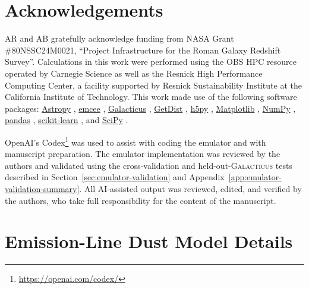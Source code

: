 \documentclass[twocolumn, apj, numberedappendix, iop]{openjournal}
\newcommand{\galacticus}{\textsc{Galacticus}\xspace}
\begin{document}
\section*{Acknowledgements}

AR and AB gratefully acknowledge funding from NASA Grant  \#80NSSC24M0021, ``Project Infrastructure for the Roman Galaxy Redshift Survey''. Calculations in this work were performed using the OBS HPC resource operated by Carnegie Science as well as the Resnick High Performance Computing Center, a facility supported by Resnick Sustainability Institute at the California Institute of Technology. This work made use of the following software packages: \href{https://www.astropy.org/}{{Astropy}}
\citep{astropy1, astropy2},
\href{https://emcee.readthedocs.io/en/stable/}{{emcee}}
\citep{ForemanMackey:2013io},
\href{https://github.com/galacticusorg/galacticus}{{Galacticus}}
\citep{2012NewA...17..175B},
\href{https://getdist.readthedocs.io/en/latest/intro.html}{{GetDist}}
\citep{2019arXiv191013970L},
\href{https://www.h5py.org/}{{h5py}}
\citep{h5py},
\href{https://matplotlib.org/}{{Matplotlib}}
\citep{matplotlib},
\href{https://numpy.org/}{{NumPy}}
\citep{numpy},
\href{https://pandas.pydata.org/}{{pandas}}
\citep{pandas-v305, mckinney-proc-scipy-2010},
\href{https://scikit-learn.org/}{{scikit-learn}}
\citep{scikit-learn},
and
\href{https://scipy.org/}{{SciPy}}
\citep{scipy}.

OpenAI's Codex\footnote{\href{https://openai.com/codex/}{https://openai.com/codex/}} was used to assist with coding the emulator and with manuscript preparation. The emulator implementation was reviewed by the authors and validated using the cross-validation and held-out-\galacticus{} tests described in Section~\ref{sec:emulator-validation} and Appendix~\ref{app:emulator-validation-summary}. All AI-assisted output was reviewed, edited, and verified by the authors, who take full responsibility for the content of the manuscript.




\appendix


\section{Emission-Line Dust Model Details}
\label{app:dust-model-details}
\end{document}
